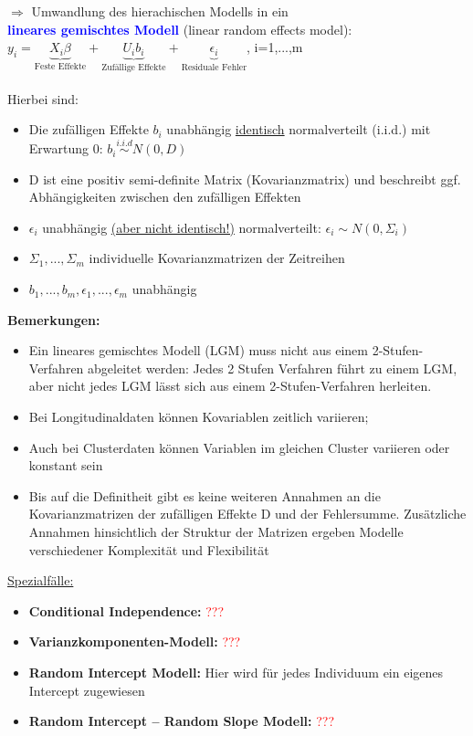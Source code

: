 \newpage
$\Rightarrow$ Umwandlung des hierachischen Modells in ein \\ \textcolor{blue}{\textbf{lineares gemischtes Modell}} (linear random effects model):
\\
$y_i=\underbrace{X_i\beta}_{\text{Feste Effekte}} + \underbrace{U_ib_i}_{\text{Zufällige Effekte}} + \underbrace{\epsilon_i}_{\text{Residuale Fehler}}$, i=1,...,m
\\\\
Hierbei sind:
\begin{itemize}
	\item Die zufälligen Effekte $b_i$ unabhängig \underline{identisch} normalverteilt (i.i.d.) mit Erwartung 0: $b_i \stackrel{i.i.d}{\sim} N(0,D)$
	\item D ist eine positiv semi-definite Matrix (Kovarianzmatrix) und beschreibt ggf. Abhängigkeiten zwischen den zufälligen Effekten
	\item $\epsilon_i$ unabhängig \underline{(aber nicht identisch!)} normalverteilt: $\epsilon_i \sim N(0,\Sigma_i)$
	\item $\Sigma_1,...,\Sigma_m$ individuelle Kovarianzmatrizen der Zeitreihen
	\item $b_1,...,b_m,\epsilon_1,...,\epsilon_m$ unabhängig
\end{itemize}

\textbf{Bemerkungen:}
\begin{itemize}
	\item Ein lineares gemischtes Modell (LGM) muss nicht aus einem 2-Stufen-Verfahren abgeleitet werden: Jedes 2 Stufen Verfahren führt zu einem LGM, aber nicht jedes LGM lässt sich aus einem 2-Stufen-Verfahren herleiten.
	\item Bei Longitudinaldaten können Kovariablen zeitlich variieren;
	\item Auch bei Clusterdaten können Variablen im gleichen Cluster variieren oder konstant sein
	\item Bis auf die Definitheit gibt es keine weiteren Annahmen an die Kovarianzmatrizen der zufälligen Effekte D und der Fehlersumme. Zusätzliche Annahmen hinsichtlich der Struktur der Matrizen ergeben Modelle verschiedener Komplexität und Flexibilität
\end{itemize}

\underline{Spezialfälle:}
\begin{itemize}
	\item \textbf{Conditional Independence:} \textcolor{red}{???}
	\item \textbf{Varianzkomponenten-Modell:} \textcolor{red}{???}
	\item \textbf{Random Intercept Modell:} Hier wird für jedes Individuum ein eigenes Intercept zugewiesen
	\item \textbf{Random Intercept – Random Slope Modell:} \textcolor{red}{???}
\end{itemize}

